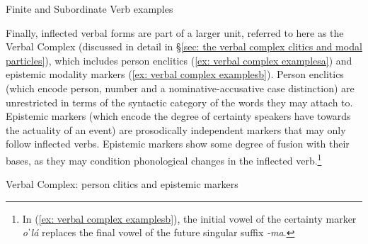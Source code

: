 
\ea\label{ex: finite and subordinate verb examples}
{Finite and Subordinate Verb examples}

    \label{ex: finite and subordinate verb examplesa}
        \label{ex: finite and subordinate verb examplesb}
    \z
\z

Finally, inflected verbal forms are part of a larger unit, referred to here as the Verbal Complex (discussed in detail in §\ref{sec: the verbal complex clitics and modal particles}), which includes person enclitics (\ref{ex: verbal complex examplesa}) and epistemic modality markers (\ref{ex: verbal complex examplesb}). Person enclitics (which encode person, number and a nominative-accusative case distinction) are unrestricted in terms of the syntactic category of the words they may attach to. Epistemic markers (which encode the degree of certainty speakers have towards the actuality of an event) are prosodically independent markers that may only follow inflected verbs. Epistemic markers show some degree of fusion with their bases, as they may condition phonological changes in the inflected verb.\footnote{In (\ref{ex: verbal complex examplesb}), the initial vowel of the certainty marker \textit{oˈlá} replaces the final vowel of the future singular suffix \textit{-ma}.}

\ea\label{ex: verbal complex examples}
{Verbal Complex: person clitics and epistemic markers}

